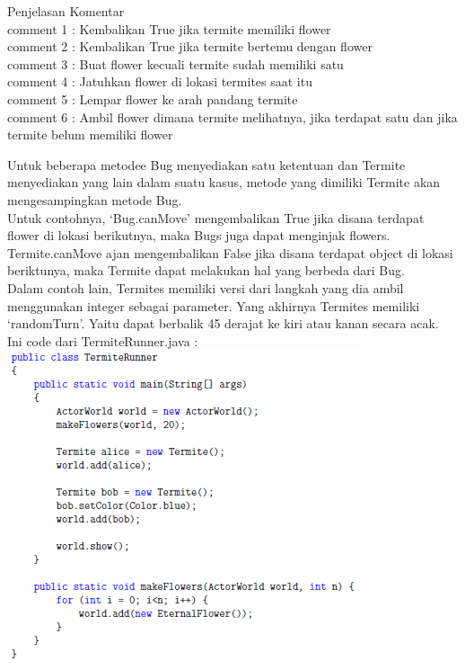 \documentclass{article}
\begin{document}
	{\small Penjelasan Komentar}\\
	{\footnotesize comment 1 : Kembalikan True jika termite memiliki flower}\\
	{\footnotesize comment 2 : Kembalikan True jika termite bertemu dengan flower}\\
	{\footnotesize comment 3 : Buat flower kecuali termite sudah memiliki satu}\\
	{\footnotesize comment 4 : Jatuhkan flower di lokasi termites saat itu}\\
	{\footnotesize comment 5 : Lempar flower ke arah pandang termite}\\
	{\footnotesize comment 6 : Ambil flower dimana termite melihatnya, jika terdapat satu dan jika termite belum memiliki flower}\\
	\newpage
	
	Untuk beberapa metodee Bug menyediakan satu ketentuan dan Termite menyediakan yang lain dalam suatu kasus, metode yang dimiliki Termite akan mengesampingkan metode Bug.
	\\
	
	Untuk contohnya, ‘Bug.canMove’ mengembalikan True jika disana terdapat flower di lokasi berikutnya, maka Bugs juga dapat menginjak flowers. Termite.canMove ajan mengembalikan False jika disana terdapat object di lokasi beriktunya, maka Termite dapat melakukan hal yang berbeda dari Bug.
	\\
	
	Dalam contoh lain, Termites memiliki versi dari langkah yang dia ambil menggunakan integer sebagai parameter. Yang akhirnya Termites memiliki ‘randomTurn’. Yaitu dapat berbalik 45 derajat ke kiri atau kanan secara acak.
	\\
	
	Ini code dari TermiteRunner.java : 
	\\
	\includegraphics{E1}
	\\
	
\end{document}
